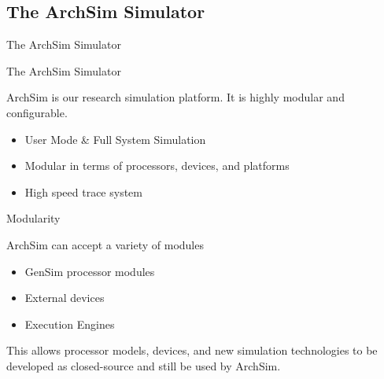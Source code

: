 \subsection{The ArchSim Simulator}

\begin{frame}{The ArchSim Simulator}

\end{frame}

\begin{frame}{The ArchSim Simulator}

ArchSim is our research simulation platform. It is highly modular and configurable.

\begin{itemize}
	\item User Mode \& Full System Simulation
	\item Modular in terms of processors, devices, and platforms
	\item High speed trace system
\end{itemize}

\end{frame}




\begin{frame}{Modularity}

ArchSim can accept a variety of modules
\begin{itemize}
	\item GenSim processor modules
	\item External devices
	\item Execution Engines
\end{itemize}

\smallskip

This allows processor models, devices, and new simulation technologies 
to be developed as closed-source and still be used by ArchSim.


\end{frame}

